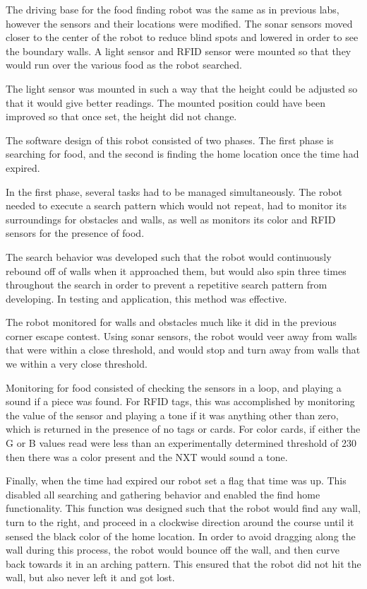 \documentclass[journal]{IEEEtran}
\begin{document}
The driving base for the food finding robot was the same as in previous labs, however the sensors and their locations were modified. The sonar sensors moved closer to the center of the robot to reduce blind spots and lowered in order to see the boundary walls. A light sensor and RFID sensor were mounted so that they would run over the various food as the robot searched.

The light sensor was mounted in such a way that the height could be adjusted so that it would give better readings. The mounted position could have been improved so that once set, the height did not change.

The software design of this robot consisted of two phases. The first phase is searching for food, and the second is finding the home location once the time had expired. 

In the first phase, several tasks had to be managed simultaneously. The robot needed to execute a search pattern which would not repeat, had to monitor its surroundings for obstacles and walls, as well as monitors its color and RFID sensors for the presence of food.

The search behavior was developed such that the robot would continuously rebound off of walls when it approached them, but would also spin three times throughout the search in order to prevent a repetitive search pattern from developing. In testing and application, this method was effective.

The robot monitored for walls and obstacles much like it did in the previous corner escape contest. Using sonar sensors, the robot would veer away from walls that were within a close threshold, and would stop and turn away from walls that we within a very close threshold. 

Monitoring for food consisted of checking the sensors in a loop, and playing a sound if a piece was found. For RFID tags, this was accomplished by monitoring the value of the sensor and playing a tone if it was anything other than zero, which is returned in the presence of no tags or cards. For color cards, if either the G or B values read were less than an experimentally determined threshold of 230 then there was a color present and the NXT would sound a tone.

Finally, when the time had expired our robot set a flag that time was up. This disabled all searching and gathering behavior and enabled the find home functionality. This function was designed such that the robot would find any wall, turn to the right, and proceed in a clockwise direction around the course until it sensed the black color of the home location. In order to avoid dragging along the wall during this process, the robot would bounce off the wall, and then curve back towards it in an arching pattern. This ensured that the robot did not hit the wall, but also never left it and got lost. 
\end{document}
